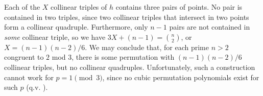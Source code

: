 \documentclass[12pt]{article}
\newcommand{\Z}{{\mathbb Z}}
\begin{document}
Each of the $X$ collinear triples of $h$ contains three pairs of points.  No pair is contained in two triples, since two collinear triples that intersect in two points form a collinear quadruple.  Furthermore, only $n-1$ pairs are not contained in {\it some} collinear triple, so we have $3 X + (n-1) = \binom{n}{2}$, or $X = (n-1)(n-2)/6$.  We may conclude that, for each prime $n > 2$ congruent to $2$ mod $3$, there is some permutation with $(n-1)(n-2)/6$ collinear triples, but no collinear quadruples.  Unfortunately, such a construction cannot work for $p = 1 \pmod{3}$, since no cubic permutation polynomials exist for such $p$ (q.v. \cite{LN97}).

\end{document}
